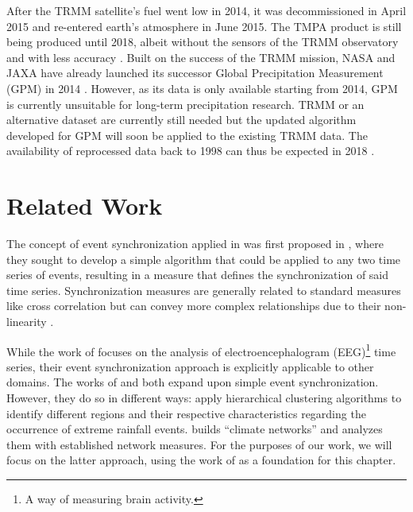 After the TRMM satellite's fuel went low in 2014, it was decommissioned in April 2015 and re-entered earth's atmosphere in June 2015. The TMPA product is still being produced until 2018, albeit without the sensors of the TRMM observatory and with less accuracy \citep{Huffman.2017}. Built on the success of the TRMM mission, NASA and JAXA have already launched its successor Global Precipitation Measurement (GPM) in 2014 \citep{GoddardEarthScienceDataInformationandServicesCenter.2011}. However, as its data is only available starting from 2014, GPM is currently unsuitable for long-term precipitation research. TRMM or an alternative dataset are currently still needed but the updated algorithm developed for GPM will soon be applied to the existing TRMM data. The availability of reprocessed data back to 1998 can thus be expected in 2018 \citep{Huffman.2016}.


\clearpage
\section{Related Work}
The concept of event synchronization applied in \citet{Stolbova.2015} was first proposed in \citet{QuianQuiroga.2002}, where they sought to develop a simple algorithm that could be applied to any two time series of events, resulting in a measure that defines the synchronization of said time series. Synchronization measures are generally related to standard measures like cross correlation but can convey more complex relationships due to their non-linearity \citep{QuianQuiroga.2002}.

While the work of \citet{QuianQuiroga.2002} focuses on the analysis of electroencephalogram (EEG)\footnote{A way of measuring brain activity.} time series, their event synchronization approach is explicitly applicable to other domains. The works of \citet{Malik.2010} and \citet{Stolbova.2015} both expand upon simple event synchronization. However, they do so in different ways: \citet{Malik.2010} apply hierarchical clustering algorithms to identify different regions and their respective characteristics regarding the occurrence of extreme rainfall events. \citet{Stolbova.2015} builds ``climate networks'' and analyzes them with established network measures. For the purposes of our work, we will focus on the latter approach, using the work of \citet{Stolbova.2015} as a foundation for this chapter.

